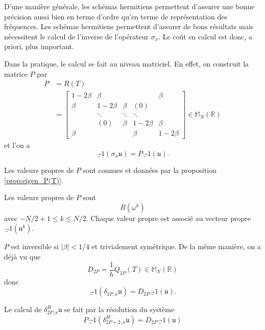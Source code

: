 D'une manière générale, les schémas hermitiens permettent d'assurer une bonne précision aussi bien en terme d'ordre qu'en terme de représentation des fréquences. Les schémas hermitiens permettent d'assurer de bons résultats mais nécessitent le calcul de l'inverse de l'opérateur $\sigma_x$. Le coût en calcul est donc, a priori, plus important.

Dans la pratique, le calcul se fait au niveau matriciel. En effet, on construit la matrice $P$ par
\begin{align}
P & = R(T) \\
  & = \begin{bmatrix}
  1 - 2 \beta & \beta &   &   & \beta \\ 
  \beta & 1 - 2 \beta & \beta & (0) &   \\ 
    & \ddots & \ddots & \ddots &   \\ 
    & (0) & \beta & 1 - 2 \beta & \beta \\ 
  \beta &   &   & \beta & 1 - 2 \beta
  \end{bmatrix} \in \mathbb{M}_{N}(\mathbb{R})
\end{align}
et l'on a 
\begin{equation}
\vec_1 (\sigma_x \mathfrak{u}) = P \vec_1 (\mathfrak{u}).
\end{equation}

Les valeurs propres de $P$ sont connues et données par la proposition \ref{prop:eigen_P(T)}.
\begin{proposition}
Les valeurs propres de $P$ sont 
\begin{equation}
R(\omega^k)
\end{equation}
avec $-N/2+1 \leq k \leq N/2$. Chaque valeur propre est associé au vecteur propre $\vec_1( \mathfrak{u}^k )$.
\end{proposition}

$P$ est inversible si $|\beta |<1/4$ et trivialement symétrique. 
De la même manière, on a déjà vu que 
\begin{equation}
D_{2P} = \dfrac{1}{h} Q_{2P}(T) \in \mathbb{M}_{N}(\mathbb{R})
\end{equation}
donc 
\begin{equation}
\vec_1 (\delta_{2P,x} \mathfrak{u}) = D_{2P} \vec_1 (\mathfrak{u}).
\end{equation}

Le calcul de $\delta^H_{2P,x} \mathfrak{u}$ se fait par la résolution du système
\begin{equation}
P \vec_1 (\delta_{2P+2,x}^H \mathfrak{u}) = D_{2P} \vec_1 (\mathfrak{u})
\end{equation}

